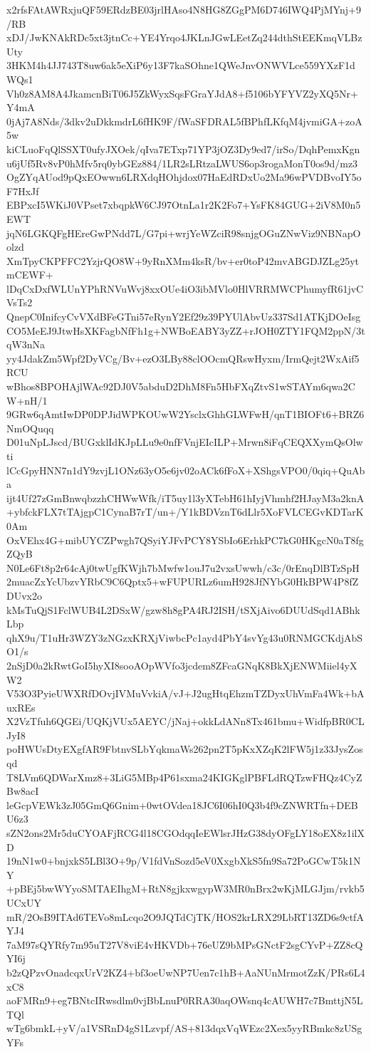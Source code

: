 x2rfsFAtAWRxjuQF59ERdzBE03jrlHAso4N8HG8ZGgPM6D746IWQ4PjMYnj+9/RB
xDJ/JwKNAkRDc5xt3jtnCc+YE4Yrqo4JKLnJGwLEetZq244dthStEEKmqVLBzUty
3HKM4h4JJ743T8uw6ak5eXiP6y13F7kaSOhne1QWeJnvONWVLce559YXzF1dWQs1
Vh0z8AM8A4JkamcnBiT06J5ZkWyxSqsFGraYJdA8+f5106bYFYVZ2yXQ5Nr+Y4mA
0jAj7A8Nds/3dkv2uDkkmdrL6fHK9F/fWaSFDRAL5fBPhfLKfqM4jvmiGA+zoA5w
kiCLuoFqQlSSXT0ufyJXOek/qIva7ETxp71YP3jOZ3Dy9ed7/irSo/DqhPemxKgn
u6jUf5Rv8vP0hMfv5rq0ybGEz884/1LR2sLRtzaLWUS6op3rogaMonT0os9d/mz3
OgZYqAUod9pQxEOwwn6LRXdqHOhjdox07HaEdRDxUo2Ma96wPVDBvoIY5oF7HxJf
EBPxcI5WKiJ0VPset7xbqpkW6CJ97OtnLa1r2K2Fo7+YsFK84GUG+2iV8M0n5EWT
jqN6LGKQFgHEreGwPNdd7L/G7pi+wrjYeWZciR98snjgOGuZNwViz9NBNapOolzd
XmTpyCKPFFC2YzjrQO8W+9yRnXMm4ksR/bv+er0toP42mvABGDJZLg25ytmCEWF+
lDqCxDxfWLUnYPhRNVuWvj8xxOUe4iO3ibMVlo0HlVRRMWCPhumyfR61jvCVsTs2
QnepC0InifcyCvVXdBFeGTni57eRynY2Ef29z39PYUlAbvUz337Sd1ATKjDOeIsg
CO5MeEJ9JtwHsXKFagbNfFh1g+NWBoEABY3yZZ+rJOH0ZTY1FQM2ppN/3tqW3nNa
yy4JdakZm5Wpf2DyVCg/Bv+ezO3LBy88clOOcmQRswHyxm/IrmQejt2WxAif5RCU
wBhos8BPOHAjlWAc92DJ0V5abduD2DhM8Fn5HbFXqZtvS1wSTAYm6qwa2CW+nH/1
9GRw6qAmtIwDP0DPJidWPKOUwW2YsclxGhhGLWFwH/qnT1BIOFt6+BRZ6NmOQuqq
D01uNpLJscd/BUGxklIdKJpLLu9e0nfFVnjEIcILP+Mrwn8iFqCEQXXymQsOlwti
lCcGpyHNN7n1dY9zvjL1ONz63yO5e6jv02oACk6fFoX+XShgsVPO0/0qiq+QuAba
ijt4Uf27zGmBnwqbzzhCHWwWfk/iT5uy1l3yXTebH61hIyjVhmhf2HJayM3a2knA
+ybfckFLX7tTAjgpC1CynaB7rT/un+/Y1kBDVznT6dLlr5XoFVLCEGvKDTarK0Am
OxVEhx4G+mibUYCZPwgh7QSyiYJFvPCY8YSbIo6ErhkPC7kG0HKgcN0aT8fgZQyB
N0Le6Ft8p2r64cAj0twUgfKWjh7bMwfw1ouJ7u2vxsUwwh/c3c/0rEnqDlBTzSpH
2muacZxYcUbzvYRbC9C6Qptx5+wFUPURLz6umH928JfNYbG0HkBPW4P8fZDUvx2o
kMsTuQjS1FclWUB4L2DSxW/gzw8h8gPA4RJ2ISH/tSXjAivo6DUUdSqd1ABhkLbp
qhX9u/T1uHr3WZY3zNGzxKRXjViwbcPc1ayd4PbY4svYg43u0RNMGCKdjAbSO1/s
2nSjD0a2kRwtGoI5hyXI8sooAOpWVfo3jcdem8ZFcaGNqK8BkXjENWMiiel4yXW2
V53O3PyieUWXRfDOvjIVMuVvkiA/vJ+J2ugHtqEhzmTZDyxUhVmFa4Wk+bAuxREs
X2VzTfuh6QGEi/UQKjVUx5AEYC/jNaj+okkLdANn8Tx461bmu+WidfpBR0CLJyI8
poHWUsDtyEXgfAR9FbtnvSLbYqkmaWs262pn2T5pKxXZqK2lFW5j1z33JysZosqd
T8LVm6QDWarXmz8+3LiG5MBp4P61sxma24KIGKglPBFLdRQTzwFHQz4CyZBw8acI
leGcpVEWk3zJ05GmQ6Gnim+0wtOVdea18JC6I06hI0Q3b4f9cZNWRTfn+DEBU6z3
sZN2ons2Mr5duCYOAFjRCG4l18CGOdqqIeEWlsrJHzG38dyOFgLY18oEX8z1ilXD
19nN1w0+bnjxkS5LBl3O+9p/V1fdVnSozd5eV0XxgbXkS5fn9Sa72PoGCwT5k1NY
+pBEj5bwWYyoSMTAEIhgM+RtN8gjkxwgypW3MR0nBrx2wKjMLGJjm/rvkb5UCxUY
mR/2OsB9ITAd6TEVo8mLcqo2O9JQTdCjTK/HOS2krLRX29LbRT13ZD6s9ctfAYJ4
7aM97sQYRfy7m95uT27V8viE4vHKVDb+76eUZ9bMPsGNctF2sgCYvP+ZZ8cQYI6j
b2zQPzvOnadcqxUrV2KZ4+bf3oeUwNP7Uen7c1hB+AaNUnMrmotZzK/PRs6L4xC8
aoFMRn9+eg7BNtcIRwsdlm0vjBbLnuP0RRA30aqOWsnq4cAUWH7c7BmttjN5LTQl
wTg6bmkL+yV/a1VSRnD4gS1Lzvpf/AS+813dqxVqWEzc2Xex5yyRBmkc8zUSgYFs
